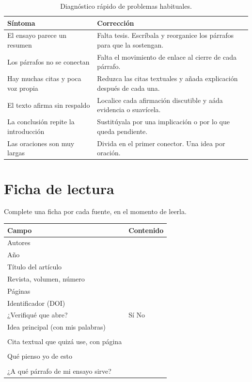 \documentclass[12pt,a4paper,openany]{report}
\begin{document}
\begin{table}[htbp]
	\centering
	\caption{Diagn\'ostico r\'apido de problemas habituales.}
	\label{tab:errores}
	\small
	\begin{tabular}{L{5.2cm} L{8.6cm}}
		\toprule
		\textbf{S\'intoma} & \textbf{Correcci\'on} \\
		\midrule
		El ensayo parece un resumen & Falta tesis. Escr\'ibala y reorganice los p\'arrafos para que la sostengan. \\
		Los p\'arrafos no se conectan & Falta el movimiento de enlace al cierre de cada p\'arrafo. \\
		Hay muchas citas y poca voz propia & Reduzca las citas textuales y a\~nada explicaci\'on despu\'es de cada una. \\
		El texto afirma sin respaldo & Localice cada afirmaci\'on discutible y a\'ada evidencia o suav\'icela. \\
		La conclusi\'on repite la introducci\'on & Sustit\'uyala por una implicaci\'on o por lo que queda pendiente. \\
		Las oraciones son muy largas & Divida en el primer conector. Una idea por oraci\'on. \\
		\bottomrule
	\end{tabular}
\end{table}

\appendix
\renewcommand{\chaptername}{Anexo}

\chapter{Ficha de lectura}
\label{anx:ficha}

Complete una ficha por cada fuente, en el momento de leerla.

\begin{table}[htbp]
	\centering
	\small
	\begin{tabular}{L{4.4cm} L{9.4cm}}
		\toprule
		\textbf{Campo} & \textbf{Contenido} \\
		\midrule
		Autores & \\
		A\~no & \\
		T\'itulo del art\'iculo & \\
		Revista, volumen, n\'umero & \\
		P\'aginas & \\
		Identificador (DOI) & \\
		¿Verifiqu\'e que abre? & S\'i \fbox{\phantom{x}} \quad No \fbox{\phantom{x}} \\
		\midrule
		Idea principal (con mis palabras) & \\
		& \\
		\midrule
		Cita textual que quiz\'a use, con p\'agina & \\
		& \\
		\midrule
		Qu\'e pienso yo de esto & \\
		& \\
		\midrule
		¿A qu\'e p\'arrafo de mi ensayo sirve? & \\
		\bottomrule
	\end{tabular}
\end{table}
\end{document}
